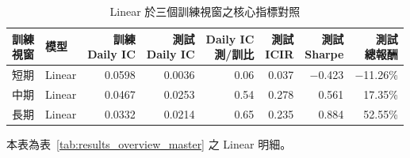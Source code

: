 \begin{table}[H]
\centering
\caption{Linear 於三個訓練視窗之核心指標對照}
\label{tab:results_linear_detail}
\begingroup
\scriptsize
\setlength{\tabcolsep}{4pt}
\renewcommand{\arraystretch}{1.10}
\begin{adjustbox}{max width=\textwidth}
\begin{tabular}{@{}llrrrrrr@{}}
\toprule
\makecell[l]{訓練\\視窗} & 模型 & \makecell[r]{訓練\\Daily IC} & \makecell[r]{測試\\Daily IC} & \makecell[r]{Daily IC\\測/訓比} & \makecell[r]{測試\\ICIR} & \makecell[r]{測試\\Sharpe} & \makecell[r]{測試\\總報酬} \\
\midrule
短期 & Linear & 0.0598 & 0.0036 & 0.06 & 0.037 & $-$0.423 & $-$11.26\% \\
中期 & Linear & 0.0467 & 0.0253 & 0.54 & 0.278 & 0.561 & 17.35\% \\
長期 & Linear & 0.0332 & 0.0214 & 0.65 & 0.235 & 0.884 & 52.55\% \\
\bottomrule
\end{tabular}
\end{adjustbox}
\smallskip

{\footnotesize 本表為表~\ref{tab:results_overview_master} 之 Linear 明細。}
\endgroup
\end{table}
